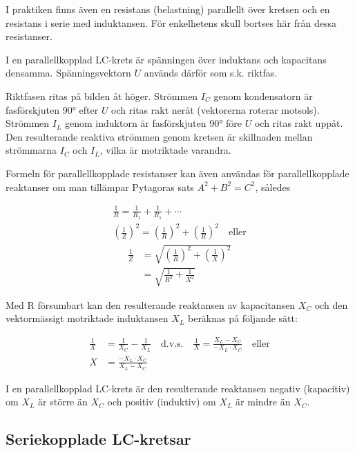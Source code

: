 I praktiken finns även en resistans (belastning) parallellt över kretsen och en
resistans i serie med induktansen. För enkelhetens skull bortses här från dessa
resistanser.

I en parallellkopplad LC-krets är spänningen över induktans och kapacitans
densamma. Spänningsvektorn \(U\) används därför som s.k. riktfas.

Riktfasen ritas på bilden åt höger. Strömmen \(I_C\) genom kondensatorn är
fasförskjuten 90° efter \(U\) och ritas rakt neråt (vektorerna roterar motsols).
Strömmen \(I_L\) genom induktorn är fasförskjuten 90° före \(U\) och ritas rakt
uppåt. Den resulterande reaktiva strömmen genom kretsen är skillnaden mellan
strömmarna \(I_C\) och \(I_L\), vilka är motriktade varandra.

Formeln för parallellkopplade resistanser kan även användas för
parallellkopplade reaktanser om man tillämpar Pytagoras sats
\(A^2 + B^2 = C^2\), således

\begin{gather*}
  \frac{1}{R} = \frac{1}{R_1} + \frac{1}{R_1} + \cdots \\
  \left(\frac{1}{Z}\right)^2 = \left(\frac{1}{R}\right)^2 +
  \left(\frac{1}{R}\right)^2 \quad \text{eller}
\end{gather*}
\begin{align*}
  \frac{1}{Z} &=
  \sqrt{\left(\frac{1}{R}\right)^2 + \left(\frac{1}{X}\right)^2} \\
  &= \sqrt{\frac{1}{R^2} + \frac{1}{X^2}}
\end{align*}

Med R försumbart kan den resulterande reaktansen av kapacitansen \(X_C\) och den
vektormässigt motriktade induktansen \(X_L\) beräknas på följande sätt:

\begin{align*}
  \frac{1}{X} &= \frac{1}{X_C} - \frac{1}{X_L} \quad \text{d.v.s.} \quad
  \frac{1}{X} = \frac{X_L - X_C}{-X_L \cdot X_C} \quad \text{eller} \\
  X &= \frac{-X_L \cdot X_C}{X_L - X_C}
\end{align*}

I en parallellkopplad LC-krets är den resulterande reaktansen negativ
(kapacitiv) om \(X_L\) är större än \(X_C\) och positiv (induktiv) om \(X_L\) är
mindre än \(X_C\).

\subsection{Seriekopplade LC-kretsar}

